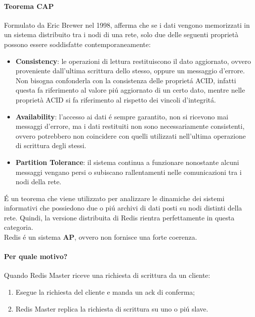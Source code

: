 \paragraph{Teorema CAP\\}
Formulato da Eric Brewer nel 1998, afferma che se i dati vengono memorizzati in un sistema distribuito tra i nodi di una rete, solo due delle seguenti
proprietà possono essere soddisfatte contemporaneamente:
\begin{itemize}
    \item \textbf{Consistency}: le operazioni di lettura restituiscono il dato aggiornato, ovvero proveniente dall'ultima scrittura dello stesso,
    oppure un messaggio d'errore. Non bisogna confonderla con la consistenza delle proprietá ACID, infatti questa fa riferimento al valore piú aggiornato
    di un certo dato, mentre nelle proprietà ACID si fa riferimento al rispetto dei vincoli d'integritá.
    \item \textbf{Availability}: l'accesso ai dati é sempre garantito, non si ricevono mai messaggi d'errore, ma i dati restituiti non sono necessariamente
    consistenti, ovvero potrebbero non coincidere con quelli utilizzati nell'ultima operazione di scrittura degli stessi.
    \item \textbf{Partition Tolerance}: il sistema continua a funzionare nonostante alcuni messaggi vengano persi o subiscano rallentamenti
    nelle comunicazioni tra i nodi della rete.
\end{itemize}

É un teorema che viene utilizzato per analizzare le dinamiche dei sistemi informativi che possiedono due o piú archivi di dati posti su
nodi distinti della rete. Quindi, la versione distribuita di Redis rientra perfettamente in questa categoria.\\

Redis é un sistema \textbf{AP}, ovvero non fornisce una forte coerenza.
\paragraph{Per quale motivo?\\}
Quando Redis Master riceve una richiesta di scrittura da un cliente:
\begin{enumerate}
    \item Esegue la richiesta del cliente e manda un ack di conferma;
    \item Redis Master replica la richiesta di scrittura su uno o piú slave.
\end{enumerate}

